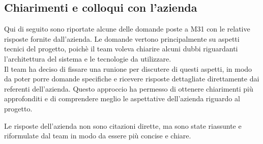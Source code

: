 \documentclass[a4paper,11pt]{article}
\begin{document}
\subsection{Chiarimenti e colloqui con l'azienda}
\parbox[t]{\linewidth}{%
Qui di seguito sono riportate alcune delle domande poste a M31 con le relative risposte fornite dall'azienda. Le domande vertono principalmente su aspetti tecnici del progetto, poichè il team voleva chiarire alcuni dubbi riguardanti l'architettura del sistema e le tecnologie da utilizzare. \\
Il team ha deciso di fissare una runione per discutere di questi aspetti, in modo da poter porre domande specifiche e ricevere risposte dettagliate direttamente dai referenti dell'azienda. Questo approccio ha permesso di ottenere chiarimenti più approfonditi e di comprendere meglio le aspettative dell'azienda riguardo al progetto.

Le risposte dell'azienda non sono citazioni dirette, ma sono state riassunte e riformulate dal team in modo da essere più concise e chiare.
}
\end{document}

